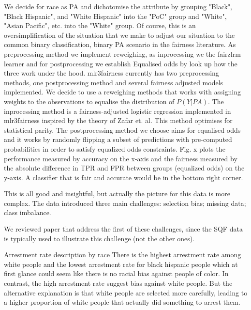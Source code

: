 We decide for race as PA and dichotomise the attribute by grouping "Black", "Black Hispanic", and "White Hispanic" into the "PoC" group and "White", "Asian Pacific", etc. into the "White" group.
Of course, this is an oversimplification of the situation that we make to adjust our situation to the common binary classification, binary PA scenario in the fairness literature.
As preprocessing method we implement reweighing, as inprocessing we the fairzlrm learner and for postprocessing we establish Equalised odds by {\color{red} {look up how the three work under the hood}}.
mlr3fairness currently has two preprocessing methods, one postprocessing method and several fairness adjusted models implemented. We decide to use a reweighing methods that works with assigning weights to the observations to equalise the distribution of $P(Y|PA)$.
The inprocessing method is a fairness-adjusted logistic regression implemented in mlr3fairness inspired by the theory of Zafar et. al. This method optimises for statistical parity. The postprocessing method we choose aims for equalised odds and it works by randomly flipping a subset of predictions with pre-computed probabilities in order to satisfy equalized odds constraints.
Fig. x plots the performance measured by accuracy on the x-axis and the fairness measured by the absolute difference in TPR and FPR between groups (equalized odds) on the y-axis. A classifier that is fair and accurate would be in the bottom right corner.

This is all good and insightful, but actually the picture for this data is more complex.
The data introduced three main challenges: selection bias; missing data; class imbalance.

We reviewed paper that address the first of these challenges, since the SQF data is typically used to illustrate this challenge (not the other ones).

Arrestment rate description by race
There is the highest arrestment rate among white people and the lowest arrestment rate for black hispanic people
which at first glance could seem like there is no racial bias against people of color. In contrast, the high arrestment rate
suggest bias against white people. But the alternative explanation is that white people are selected more carefully,
leading to a higher proportion of white people that actually did something to arrest them.